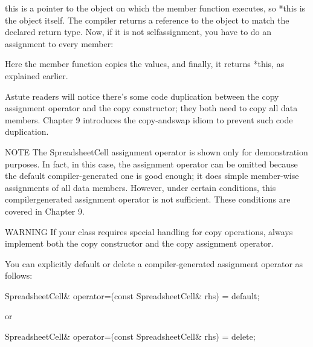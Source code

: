 \begin{cpp}
        return *this;
    }
\end{cpp}

this is a pointer to the object on which the member function executes, so *this is the object itself. The compiler returns a reference to the object to match the declared return type. Now, if it is not selfassignment, you have to do an assignment to every member:

\begin{cpp}
    m_value = rhs.m_value;
    return *this;
}
\end{cpp}

Here the member function copies the values, and finally, it returns *this, as explained earlier.

Astute readers will notice there’s some code duplication between the copy assignment operator and the copy constructor; they both need to copy all data members. Chapter 9 introduces the copy-andswap idiom to prevent such code duplication.

\begin{myNotic}{NOTE}
The SpreadsheetCell assignment operator is shown only for demonstration purposes. In fact, in this case, the assignment operator can be omitted because the default compiler-generated one is good enough; it does simple member-wise assignments of all data members. However, under certain conditions, this compilergenerated assignment operator is not sufficient. These conditions are covered in Chapter 9.
\end{myNotic}

\begin{myWarning}{WARNING}
If your class requires special handling for copy operations, always implement both the copy constructor and the copy assignment operator.
\end{myWarning}


You can explicitly default or delete a compiler-generated assignment operator as follows:

\begin{cpp}
SpreadsheetCell& operator=(const SpreadsheetCell& rhs) = default;
\end{cpp}

or

\begin{cpp}
SpreadsheetCell& operator=(const SpreadsheetCell& rhs) = delete;
\end{cpp}


